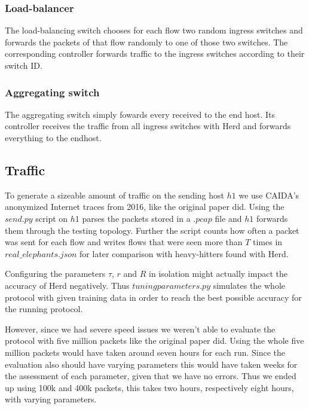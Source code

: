 \documentclass[11pt,oneside,a4paper]{article}
\begin{document}
\subsubsection{Load-balancer}
The load-balancing switch chooses for each flow two random ingress switches and forwards the packets of that flow randomly to one of those two switches.
The corresponding controller forwards traffic to the ingress switches according to their switch ID.

\subsubsection{Aggregating switch}
The aggregating switch simply fowards every received to the end host.
Its controller receives the traffic from all ingress switches with Herd and forwards everything to the endhost.

\subsection{Traffic} \label{traffic}
To generate a sizeable amount of traffic on the sending host $h1$ we use CAIDA's anonymized Internet traces from 2016, like the original paper did. Using the $send.py$ script on $h1$ parses the packets stored in a $.pcap$ file and $h1$ forwards them through the testing topology. Further the script counts how often a packet was sent for each flow and writes flows that were seen more than $T$ times in $real\_elephants.json$ for later comparison with heavy-hitters found with Herd.

Configuring the parameters $\tau$, $r$ and $R$ in isolation might actually impact the accuracy of Herd negatively. Thus $tuningparameters.py$ simulates the whole protocol with given training data in order to reach the best possible accuracy for the running protocol.

However, since we had severe speed issues we weren't able to evaluate the protocol with five million packets like the original paper did. Using the whole five million packets would have taken around seven hours for each run. Since the evaluation also should have varying parameters this would have taken weeks for the assessment of each parameter, given that we have no errors. Thus we ended up using 100k and 400k packets, this takes two hours, respectively eight hours, with varying parameters.

\end{document}
